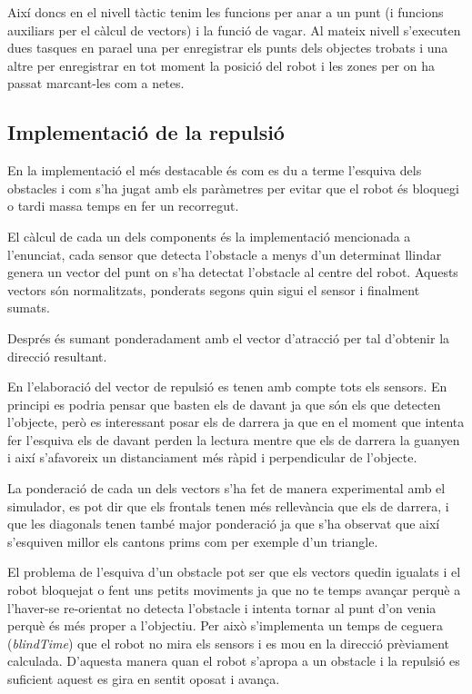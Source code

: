 Així doncs en el nivell tàctic tenim les funcions per anar a un punt (i funcions auxiliars per el càlcul
de vectors) i la funció de vagar. Al mateix nivell s'executen dues tasques en para\lgem el una per
enregistrar els punts dels objectes trobats i una altre per enregistrar en tot moment la posició del 
robot i les zones per on ha passat marcant-les com a netes.

\subsection{Implementació de la repulsió}

En la implementació el més destacable és com es du a terme l'esquiva dels obstacles i com s'ha jugat amb
els paràmetres per evitar que el robot és bloquegi o tardi massa temps en fer un recorregut. 

El càlcul de cada un dels components és la implementació mencionada a l'enunciat, cada sensor que
detecta l'obstacle a menys d'un determinat llindar genera un vector del punt on s'ha detectat l'obstacle
al centre del robot. Aquests vectors són normalitzats, ponderats segons quin sigui el sensor i finalment
sumats.

Després és sumant ponderadament amb el vector d'atracció per tal d'obtenir la direcció resultant.

En l'elaboració del vector de repulsió es tenen amb compte tots els sensors. En principi es podria pensar
que basten els de davant ja que són els que detecten l'objecte, però es interessant posar els de darrera
ja que en el moment que intenta fer l'esquiva els de davant perden la lectura mentre que els de darrera
la guanyen i així s'afavoreix un distanciament més ràpid i perpendicular de l'objecte. 

La ponderació de cada un dels vectors s'ha fet de manera experimental amb el simulador, es pot dir
que els frontals tenen més rellevància que els de darrera, i que les diagonals tenen també major
ponderació ja que s'ha observat que així s'esquiven millor els cantons prims com per exemple d'un triangle.

El problema de l'esquiva d'un obstacle pot ser que els vectors quedin igualats i el robot bloquejat
o fent uns petits moviments ja que no te temps avançar perquè a l'haver-se re-orientat no detecta l'obstacle
i intenta tornar al punt d'on venia perquè és més proper a l'objectiu. Per això s'implementa un temps de
ceguera (\emph{blindTime}) que el robot no mira els sensors i es mou en la direcció prèviament calculada.
D'aquesta manera quan el robot s'apropa a un obstacle i la repulsió es suficient aquest es gira en sentit
oposat i avança.


